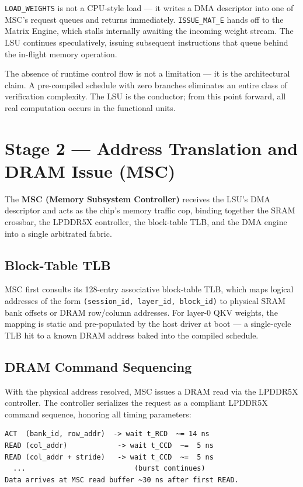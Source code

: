 \documentclass[11pt,letterpaper]{article}
\begin{document}
\texttt{LOAD\_WEIGHTS} is not a CPU-style load --- it writes a DMA descriptor into one of
MSC's request queues and returns immediately. \texttt{ISSUE\_MAT\_E} hands off to the Matrix
Engine, which stalls internally awaiting the incoming weight stream. The LSU continues
speculatively, issuing subsequent instructions that queue behind the in-flight memory
operation.

The absence of runtime control flow is not a limitation --- it is the architectural claim. A
pre-compiled schedule with zero branches eliminates an entire class of verification
complexity. The LSU is the conductor; from this point forward, all real computation occurs in
the functional units.

\section{Stage 2 --- Address Translation and DRAM Issue (MSC)}

The \textbf{MSC (Memory Subsystem Controller)} receives the LSU's DMA descriptor and acts as
the chip's memory traffic cop, binding together the SRAM crossbar, the LPDDR5X controller,
the block-table TLB, and the DMA engine into a single arbitrated fabric.

\subsection{Block-Table TLB}

MSC first consults its 128-entry associative block-table TLB, which maps logical addresses of
the form \texttt{(session\_id, layer\_id, block\_id)} to physical SRAM bank offsets or DRAM
row/column addresses. For layer-0 QKV weights, the mapping is static and pre-populated by the
host driver at boot --- a single-cycle TLB hit to a known DRAM address baked into the
compiled schedule.

\subsection{DRAM Command Sequencing}

With the physical address resolved, MSC issues a DRAM read via the LPDDR5X controller. The
controller serializes the request as a compliant LPDDR5X command sequence, honoring all
timing parameters:

\begin{lstlisting}
ACT  (bank_id, row_addr)  -> wait t_RCD  ~= 14 ns
READ (col_addr)            -> wait t_CCD  ~=  5 ns
READ (col_addr + stride)   -> wait t_CCD  ~=  5 ns
  ...                          (burst continues)
Data arrives at MSC read buffer ~30 ns after first READ.
\end{lstlisting}
\end{document}
